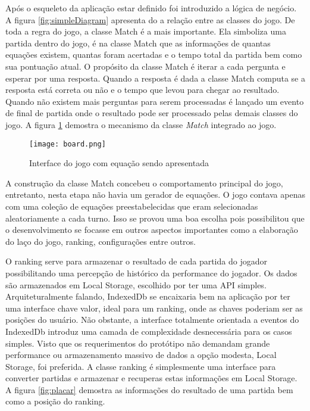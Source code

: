 Após o esqueleto da aplicação estar definido foi introduzido a
lógica de negócio. A figura \ref{fig:simpleDiagram} apresenta do
a relação entre as classes do jogo. De toda a regra do jogo, a
classe Match é a mais importante. Ela simboliza uma partida dentro do
jogo, é na classe Match que as informações de quantas equações
existem, quantas foram acertadas e o tempo total da partida bem como
sua pontuação atual. O propósito da classe Match é iterar a cada
pergunta e esperar por uma resposta. Quando a resposta é dada a classe
Match computa se a resposta está correta ou não e o tempo que levou
para chegar ao resultado. Quando não existem mais perguntas para serem
processadas é lançado um evento de final de partida onde o resultado
pode ser processado pelas demais classes do jogo.
A figura \ref{fig:interface} demostra o mecanismo da classe \textit{Match} integrado
ao jogo.

\begin{figure}
    \centering
    \texttt{[image: board.png]}
	\caption{Interface do jogo com equação sendo apresentada}
    \label{fig:interface}
\end{figure}

A construção da classe Match concebeu o comportamento principal do
jogo, entretanto, nesta etapa não havia um gerador de equações. O
jogo contava apenas com uma coleção de equações preestabelecidas que
eram selecionadas aleatoriamente a cada turno. Isso se provou uma boa
escolha pois possibilitou que o desenvolvimento se focasse em outros
aspectos importantes como a elaboração do laço do jogo, ranking,
configurações entre outros.

O ranking serve para armazenar o resultado de cada partida do jogador
possibilitando uma percepção de histórico da performance do jogador.
Os dados são armazenados em Local Storage, escolhido por ter uma API
simples. Arquiteturalmente falando, IndexedDb se encaixaria bem na
aplicação por ter uma interface chave valor, ideal para um ranking,
onde as chaves poderiam ser as posições do usuário. Não obstante,
a interface totalmente orientada a eventos do IndexedDb introduz uma
camada de complexidade desnecessária para os casos simples. Visto que
os requerimentos do protótipo não demandam grande performance ou
armazenamento massivo de dados a opção modesta, Local Storage,
foi preferida. A classe ranking é simplesmente uma interface para
converter partidas e armazenar e recuperas estas informações em Local
Storage. A figura \ref{fig:placar} demostra as informações do resultado
de uma partida bem como a posição do ranking.

